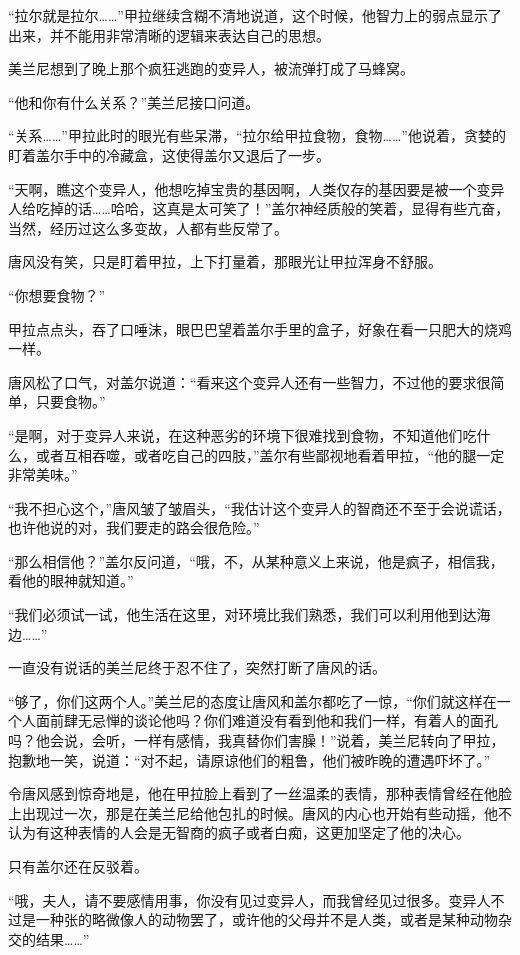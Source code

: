 “拉尔就是拉尔……”甲拉继续含糊不清地说道，这个时候，他智力上的弱点显示了出来，并不能用非常清晰的逻辑来表达自己的思想。

美兰尼想到了晚上那个疯狂逃跑的变异人，被流弹打成了马蜂窝。

“他和你有什么关系？”美兰尼接口问道。

“关系……”甲拉此时的眼光有些呆滞，“拉尔给甲拉食物，食物……”他说着，贪婪的盯着盖尔手中的冷藏盒，这使得盖尔又退后了一步。

“天啊，瞧这个变异人，他想吃掉宝贵的基因啊，人类仅存的基因要是被一个变异人给吃掉的话……哈哈，这真是太可笑了！”盖尔神经质般的笑着，显得有些亢奋，当然，经历过这么多变故，人都有些反常了。

唐风没有笑，只是盯着甲拉，上下打量着，那眼光让甲拉浑身不舒服。

“你想要食物？”

甲拉点点头，吞了口唾沫，眼巴巴望着盖尔手里的盒子，好象在看一只肥大的烧鸡一样。

唐风松了口气，对盖尔说道：“看来这个变异人还有一些智力，不过他的要求很简单，只要食物。”

“是啊，对于变异人来说，在这种恶劣的环境下很难找到食物，不知道他们吃什么，或者互相吞噬，或者吃自己的四肢，”盖尔有些鄙视地看着甲拉，“他的腿一定非常美味。”

“我不担心这个，”唐风皱了皱眉头，“我估计这个变异人的智商还不至于会说谎话，也许他说的对，我们要走的路会很危险。”

“那么相信他？”盖尔反问道，“哦，不，从某种意义上来说，他是疯子，相信我，看他的眼神就知道。”

“我们必须试一试，他生活在这里，对环境比我们熟悉，我们可以利用他到达海边……”

一直没有说话的美兰尼终于忍不住了，突然打断了唐风的话。

“够了，你们这两个人。”美兰尼的态度让唐风和盖尔都吃了一惊，“你们就这样在一个人面前肆无忌惮的谈论他吗？你们难道没有看到他和我们一样，有着人的面孔吗？他会说，会听，一样有感情，我真替你们害臊！”说着，美兰尼转向了甲拉，抱歉地一笑，说道：“对不起，请原谅他们的粗鲁，他们被昨晚的遭遇吓坏了。”

令唐风感到惊奇地是，他在甲拉脸上看到了一丝温柔的表情，那种表情曾经在他脸上出现过一次，那是在美兰尼给他包扎的时候。唐风的内心也开始有些动摇，他不认为有这种表情的人会是无智商的疯子或者白痴，这更加坚定了他的决心。

只有盖尔还在反驳着。

“哦，夫人，请不要感情用事，你没有见过变异人，而我曾经见过很多。变异人不过是一种张的略微像人的动物罢了，或许他的父母并不是人类，或者是某种动物杂交的结果……”

